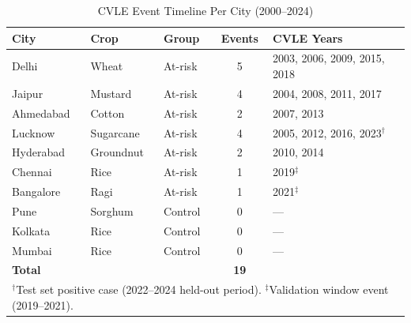 \documentclass{ieeeaccess}
\begin{document}
\begin{table}[h]
\centering
\caption{CVLE Event Timeline Per City (2000--2024)}
\label{tab:cvle_timeline}
\begin{tabular}{|l|l|l|c|l|}
\hline
\textbf{City} & \textbf{Crop} & \textbf{Group} & \textbf{Events} & \textbf{CVLE Years} \\
\hline
Delhi      & Wheat     & At-risk & 5 & 2003, 2006, 2009, 2015, 2018 \\
Jaipur     & Mustard   & At-risk & 4 & 2004, 2008, 2011, 2017 \\
Ahmedabad  & Cotton    & At-risk & 2 & 2007, 2013 \\
Lucknow    & Sugarcane & At-risk & 4 & 2005, 2012, 2016, 2023$^\dagger$ \\
Hyderabad  & Groundnut & At-risk & 2 & 2010, 2014 \\
Chennai    & Rice      & At-risk & 1 & 2019$^\ddagger$ \\
Bangalore  & Ragi      & At-risk & 1 & 2021$^\ddagger$ \\
Pune       & Sorghum   & Control & 0 & --- \\
Kolkata    & Rice      & Control & 0 & --- \\
Mumbai     & Rice      & Control & 0 & --- \\
\hline
\multicolumn{3}{|l|}{\textbf{Total}} & \textbf{19} & \\
\hline
\multicolumn{5}{l}{$^\dagger$Test set positive case (2022--2024 held-out period). $^\ddagger$Validation window event (2019--2021).}
\end{tabular}
\end{table}
\end{document}
